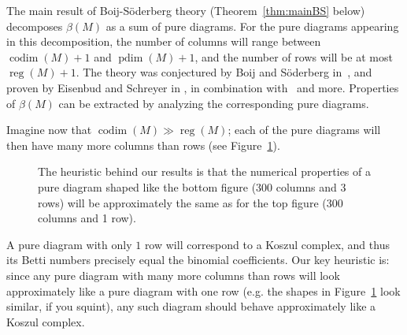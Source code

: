 \documentclass[12pt]{amsart}
\theoremstyle{remark}
\newcommand{\pdim}{\operatorname{pdim}}
\newcommand{\reg}{\operatorname{reg}}
\newcommand{\codim}{\operatorname{codim}}
\begin{document}
The main result of Boij-S\"oderberg theory (Theorem~\ref{thm:mainBS} below) decomposes $\beta(M)$ as a sum of pure diagrams.  For the pure diagrams appearing in this decomposition, the number of columns will range between $\codim(M)+1$ and $\pdim(M)+1$, and the number of rows will be at most $\reg(M)+1$. The theory was conjectured by Boij and S\"oderberg in~\cite{boij-sod1}, and proven by Eisenbud and Schreyer in \cite{eis-schrey1}, in combination with~\cite{efw,boij-sod2} and more.  Properties of $\beta(M)$ can be extracted by analyzing the corresponding pure diagrams.

Imagine now that $\codim(M) \gg \reg(M)$; each of the pure diagrams will then have many more columns than rows (see Figure~\ref{fig:twodiagrams}).
\begin{figure}

\vspace{.5cm}


\caption{The heuristic behind our results is that the numerical properties of a pure diagram shaped like the bottom figure (300 columns and 3 rows) will be approximately the same as for the top figure (300 columns and 1 row).  
}
\label{fig:twodiagrams}
\end{figure}
A pure diagram with only $1$ row will correspond to a Koszul complex, and thus its Betti numbers precisely equal the binomial coefficients.  
Our key heuristic is: since any pure diagram with many more columns than rows will look approximately like a pure diagram with one row (e.g. the shapes in Figure~\ref{fig:twodiagrams} look similar, if you squint), any such diagram should behave approximately like a Koszul complex.
\end{document}
